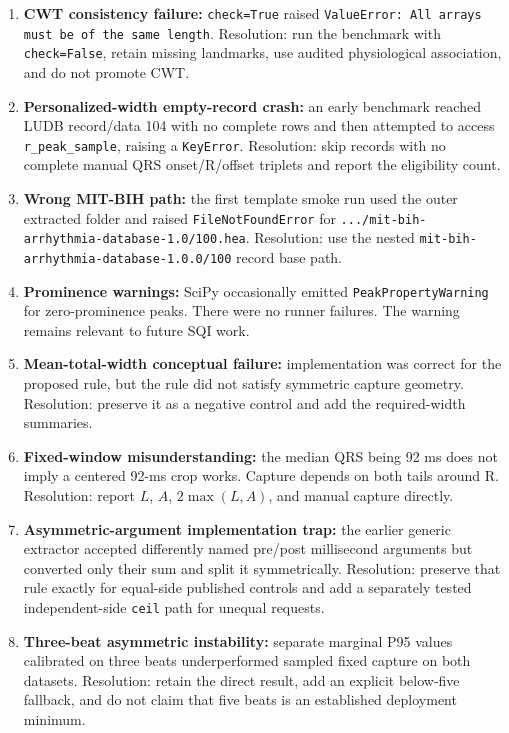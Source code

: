 \documentclass[11pt,a4paper]{article}
\begin{document}
\begin{enumerate}
  \item \textbf{CWT consistency failure:} \texttt{check=True} raised \texttt{ValueError: All arrays must be of the same length}. Resolution: run the benchmark with \texttt{check=False}, retain missing landmarks, use audited physiological association, and do not promote CWT.
  \item \textbf{Personalized-width empty-record crash:} an early benchmark reached LUDB record/data 104 with no complete rows and then attempted to access \texttt{r\_peak\_sample}, raising a \texttt{KeyError}. Resolution: skip records with no complete manual QRS onset/R/offset triplets and report the eligibility count.
  \item \textbf{Wrong MIT-BIH path:} the first template smoke run used the outer extracted folder and raised \texttt{FileNotFoundError} for \texttt{.../mit-bih-arrhythmia-database-1.0/100.hea}. Resolution: use the nested \texttt{mit-bih-arrhythmia-database-1.0.0/100} record base path.
  \item \textbf{Prominence warnings:} SciPy occasionally emitted \texttt{PeakPropertyWarning} for zero-prominence peaks. There were no runner failures. The warning remains relevant to future SQI work.
  \item \textbf{Mean-total-width conceptual failure:} implementation was correct for the proposed rule, but the rule did not satisfy symmetric capture geometry. Resolution: preserve it as a negative control and add the required-width summaries.
  \item \textbf{Fixed-window misunderstanding:} the median QRS being 92 ms does not imply a centered 92-ms crop works. Capture depends on both tails around R. Resolution: report $L$, $A$, $2\max(L,A)$, and manual capture directly.
  \item \textbf{Asymmetric-argument implementation trap:} the earlier generic extractor accepted differently named pre/post millisecond arguments but converted only their sum and split it symmetrically. Resolution: preserve that rule exactly for equal-side published controls and add a separately tested independent-side \texttt{ceil} path for unequal requests.
  \item \textbf{Three-beat asymmetric instability:} separate marginal P95 values calibrated on three beats underperformed sampled fixed capture on both datasets. Resolution: retain the direct result, add an explicit below-five fallback, and do not claim that five beats is an established deployment minimum.

\end{enumerate}
\end{document}

